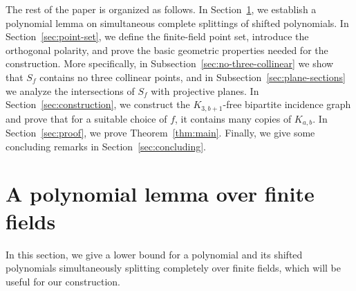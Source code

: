 \documentclass[11pt,a4paper]{article}
\theoremstyle{definition}
\theoremstyle{remark}
\begin{document}
The rest of the paper is organized as follows. In Section~\ref{sec:polynomial-lemma}, we establish a polynomial lemma on simultaneous complete splittings of shifted polynomials. In Section~\ref{sec:point-set}, we define the finite-field point set, introduce the orthogonal polarity, and prove the basic geometric properties needed for the construction. More specifically, in Subsection~\ref{sec:no-three-collinear} we show that $S_f$ contains no three collinear points, and in Subsection~\ref{sec:plane-sections} we analyze the intersections of $S_f$ with projective planes. 
In Section~\ref{sec:construction}, we construct the $K_{3,b+1}$-free bipartite incidence graph and prove that for a suitable choice of $f$, it contains many copies of $K_{a,b}$. In Section~\ref{sec:proof}, we prove Theorem~\ref{thm:main}. Finally, we give some concluding remarks in Section~\ref{sec:concluding}.








\section{A polynomial lemma over finite fields} \label{sec:polynomial-lemma}

In this section, we give a lower bound for a polynomial and its shifted polynomials simultaneously splitting completely over finite fields, which will be useful for our construction.

\end{document}
